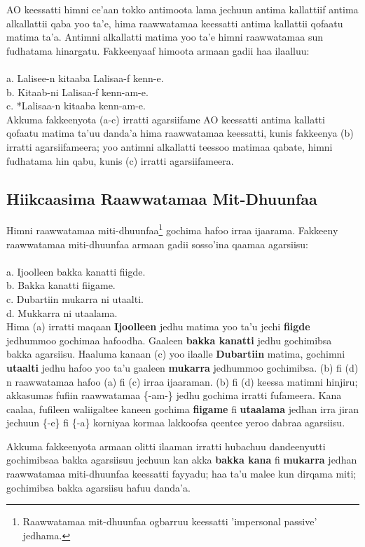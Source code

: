 \documentclass[11pt,b5paper]{book}
\begin{document}
AO keessatti himni ce’aan tokko antimoota lama jechuun antima kallattiif antima alkallattii qaba yoo ta’e, hima raawwatamaa keessatti antima kallattii qofaatu matima ta’a. Antimni alkallatti matima yoo ta’e himni raawwatamaa sun fudhatama hinargatu. Fakkeenyaaf himoota armaan gadii haa ilaalluu:\\
\\
a. Lalisee-n kitaaba Lalisaa-f kenn-e.\\
b. Kitaab-ni Lalisaa-f kenn-am-e.\\
c. *Lalisaa-n kitaaba kenn-am-e.\\

Akkuma fakkeenyota (a-c) irratti agarsiifame AO keessatti antima kallatti qofaatu matima ta’uu danda’a hima raawwatamaa keessatti, kunis fakkeenya (b) irratti agarsiifameera; yoo antimni alkallatti teessoo matimaa qabate, himni fudhatama hin qabu, kunis (c) irratti agarsiifameera. 

\subsection{Hiikcaasima Raawwatamaa Mit-Dhuunfaa}
Himni raawwatamaa miti-dhuunfaa\footnote{Raawwatamaa mit-dhuunfaa ogbarruu keessatti 'impersonal passive' jedhama.} gochima hafoo irraa ijaarama. Fakkeeny raawwatamaa miti-dhuunfaa armaan gadii
sosso’ina qaamaa agarsiisu: \\
\\
a. Ijoolleen bakka kanatti fiigde.\\
b. Bakka kanatti fiigame.\\
c. Dubartiin mukarra ni utaalti.\\
d. Mukkarra ni utaalama. \\

Hima (a) irratti maqaan \textbf{Ijoolleen} jedhu matima yoo ta’u jechi \textbf{fiigde} jedhummoo gochimaa hafoodha. Gaaleen \textbf{bakka kanatti} jedhu gochimibsa bakka agarsiisu. Haaluma kanaan (c) yoo ilaalle \textbf{Dubartiin} matima, gochimni \textbf{utaalti} jedhu hafoo yoo ta’u gaaleen \textbf{mukarra} jedhummoo gochimibsa. (b) fi (d) n raawwatamaa hafoo (a) fi (c) irraa ijaaraman. (b) fi (d) keessa matimni hinjiru; akkasumas fufiin raawwatamaa \{-am-\} jedhu gochima irratti fufameera. Kana caalaa, fufileen waliigaltee kaneen gochima \textbf{fiigame} fi \textbf{utaalama} jedhan irra jiran jechuun \{-e\} fi \{-a\} korniyaa kormaa lakkoofsa qeentee yeroo dabraa agarsiisu.

Akkuma fakkeenyota armaan olitti ilaaman irratti hubachuu dandeenyutti gochimibsaa bakka agarsiisuu jechuun kan akka \textbf{bakka kana} fi \textbf{mukarra} jedhan raawwatamaa miti-dhuunfaa
keessatti fayyadu; haa ta’u malee kun dirqama miti; gochimibsa bakka agarsiisu hafuu danda’a.
\end{document}
